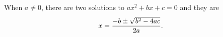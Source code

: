 When \(a \ne 0\), there are two solutions to \(ax^2 + bx + c = 0\) and they are
  \[x = {-b \pm \sqrt{b^2-4ac} \over 2a}.\]